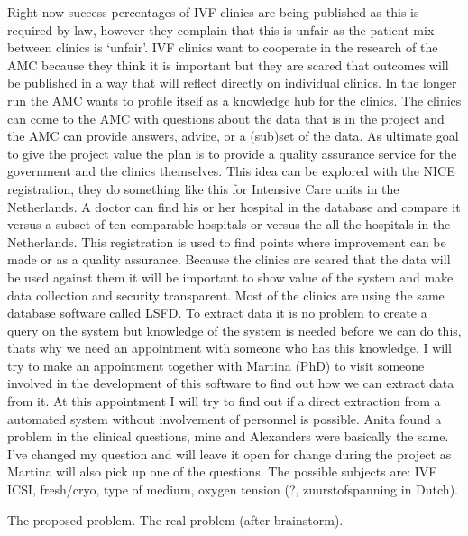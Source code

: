 

Right now success percentages of IVF clinics are being published as this is required by law, however they complain that this is unfair as the patient mix between clinics is ‘unfair’. 
IVF clinics want to cooperate in the research of the AMC because they think it is important but they are scared that outcomes will be published in a way that will reflect directly on individual clinics.
In the longer run the AMC wants to profile itself as a knowledge hub for the clinics. The clinics can come to the AMC with questions about the data that is in the project and the AMC can provide answers, advice, or a (sub)set of the data.
As ultimate goal to give the project value the plan is to provide a quality assurance service for the government and the clinics themselves.
This idea can be explored with the NICE registration, they do something like this for Intensive Care units in the Netherlands. 
A doctor can find his or her hospital in the database and compare it versus a subset of ten comparable hospitals or versus the all the hospitals in the Netherlands. 
This registration is used to find points where improvement can be made or as a quality assurance.
Because the clinics are scared that the data will be used against them it will be important to show value of the system and make data collection and security transparent.
Most of the clinics are using the same database software called LSFD. 
To extract data it is no problem to create a query on the system but knowledge of the system is needed before we can do this, thats why we need an appointment with someone who has this knowledge. 
I will try to make an appointment together with Martina (PhD) to visit someone involved in the development of this software to find out how we can extract data from it. 
At this appointment I will try to find out if a direct extraction from a automated system without involvement of personnel is possible.
Anita found a problem in the clinical questions, mine and Alexanders were basically the same. 
I’ve changed my question and will leave it open for change during the project as Martina will also pick up one of the questions. 
The possible subjects are: IVF ICSI, fresh/cryo, type of medium, oxygen tension (?, zuurstofspanning in Dutch).

The proposed problem.
The real problem (after brainstorm).